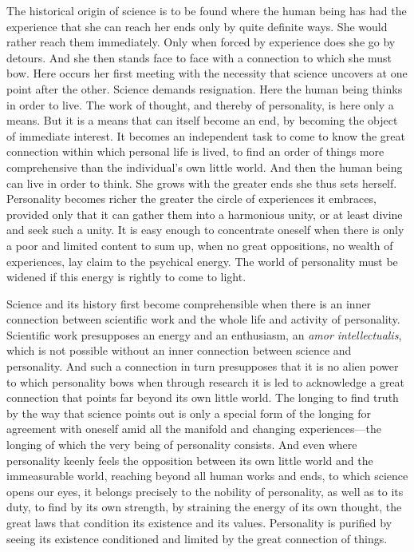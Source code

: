 \documentclass[12pt]{article}
\newcommand{\opage}[1]{\marginnote{\footnotesize\textit{[#1]}}}
\begin{document}
The historical origin of science is to be found where the human being has had
the experience that she can reach her ends only by quite definite ways. She
would rather reach them immediately. Only when forced by experience does she go
by detours. And she then stands face to face with a connection to which she must
bow. Here occurs her first meeting with the necessity that science uncovers at
one point after the
\opage{11}%
other. Science demands resignation. Here the human being thinks in order to
live. The work of thought, and thereby of personality, is here only a means. But
it is a means that can itself become an end, by becoming the object of immediate
interest. It becomes an independent task to come to know the great connection
within which personal life is lived, to find an order of things more
comprehensive than the individual's own little world. And then the human being
can live in order to think. She grows with the greater ends she thus sets
herself. Personality becomes richer the greater the circle of experiences it
embraces, provided only that it can gather them into a harmonious unity, or at
least divine and seek such a unity. It is easy enough to concentrate oneself
when there is only a poor and limited content to sum up, when no great
oppositions, no wealth of experiences, lay claim to the psychical energy. The
world of personality must be widened if this energy is rightly to come to light.

Science and its history first become comprehensible when there is an inner
connection between scientific
\opage{12}%
work and the whole life and activity of personality. Scientific work presupposes
an energy and an enthusiasm, an \textit{amor intellectualis}, which is not
possible without an inner connection between science and personality. And such
a connection in turn presupposes that it is no alien power to which personality
bows when through research it is led to acknowledge a great connection that
points far beyond its own little world. The longing to find truth by the way
that science points out is only a special form of the longing for agreement with
oneself amid all the manifold and changing experiences---the longing of which
the very being of personality consists. And even where personality keenly feels
the opposition between its own little world and the immeasurable world,
reaching beyond all human works and ends, to which science opens our eyes, it
belongs precisely to the nobility of personality, as well as to its duty, to
find by its own strength, by straining the energy of its own thought, the great
laws that condition its existence and its values. Personality is purified by
seeing its
\opage{13}%
existence conditioned and limited by the great connection of things.
\end{document}
